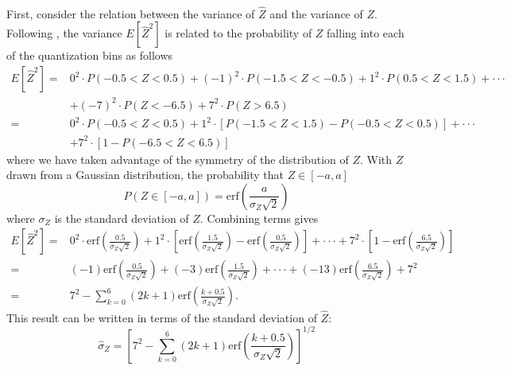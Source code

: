 \documentclass[11pt]{article}
\begin{document}
\paragraph{}
First, consider the relation between the variance of $\hat Z$ and the variance of $Z$. Following \cite{VV}, the variance $E[\hat Z^2]$ is related to the probability of $Z$ falling into each of the quantization bins as follows
\begin{equation}
\begin{split}
E[\hat Z^2]=&0^2\cdot P(-0.5<Z<0.5) +(-1)^2\cdot P(-1.5<Z<-0.5)+1^2\cdot P(0.5<Z<1.5)+\cdot\cdot\cdot\\
&+(-7)^2\cdot P(Z<-6.5)+7^2\cdot P(Z>6.5)\\
=&0^2\cdot P(-0.5<Z<0.5)+1^2\cdot[P(-1.5<Z<1.5)-P(-0.5<Z<0.5)]+\cdot\cdot\cdot\\
&+7^2\cdot[1-P(-6.5<Z<6.5)]
\end{split}
\end{equation}
where we have taken advantage of the symmetry of the distribution of $Z$. With $Z$ drawn from a Gaussian distribution, the probability that $Z\in[-a,a]$
\begin{equation}
P(Z\in[-a,a])=\textrm{erf}\left(\frac{a}{\sigma_Z\sqrt{2}}\right)
\end{equation}
where $\sigma_Z$ is the standard deviation of $Z$. Combining terms gives
\begin{align}
E[\hat Z^2]=&0^2\cdot\textrm{erf}\left(\frac{0.5}{\sigma_Z\sqrt{2}}\right)+1^2\cdot\left[\textrm{erf}\left(\frac{1.5}{\sigma_Z\sqrt{2}}\right)-\textrm{erf}\left(\frac{0.5}{\sigma_Z\sqrt{2}}\right)\right]+\cdot\cdot\cdot+7^2\cdot\left[1-\textrm{erf}\left(\frac{6.5}{\sigma_Z\sqrt{2}}\right)\right]\nonumber\\
=&(-1)\textrm{erf}\left(\frac{0.5}{\sigma_Z\sqrt{2}}\right)+(-3)\textrm{erf}\left(\frac{1.5}{\sigma_Z\sqrt{2}}\right)+\cdot\cdot\cdot+(-13)\textrm{erf}\left(\frac{6.5}{\sigma_Z\sqrt{2}}\right)+7^2\nonumber\\
=&7^2-\sum_{k=0}^6(2k+1)\textrm{erf}\left(\frac{k+0.5}{\sigma_Z\sqrt{2}}\right).
\end{align}
This result can be written in terms of the standard deviation of $\hat Z$:
\begin{equation}\label{autocorr}
\hat \sigma_Z = \left[7^2-\sum_{k=0}^6(2k+1)\textrm{erf}\left(\frac{k+0.5}{\sigma_Z\sqrt{2}}\right)\right]^{1/2}
\end{equation}
\end{document}
